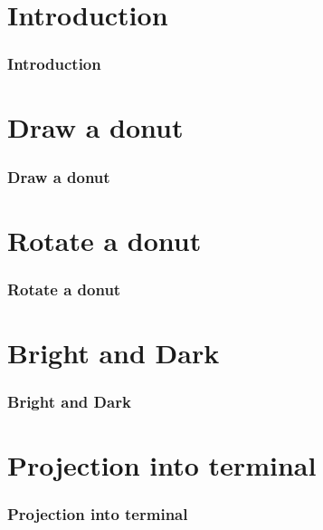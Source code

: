 \documentclass[12pt, t]{beamer}
\begin{document}

\section{Introduction}
\begin{frame}
    \frametitle{Introduction}

    
\end{frame}


\section{Draw a donut}
\begin{frame}
    \frametitle{Draw a donut}

\end{frame}


\section{Rotate a donut}
\begin{frame}
    \frametitle{Rotate a donut}

\end{frame}


\section{Bright and Dark}
\begin{frame}
    \frametitle{Bright and Dark}

\end{frame}


\section{Projection into terminal}
\begin{frame}
    \frametitle{Projection into terminal}

\end{frame}
\end{document}
